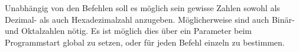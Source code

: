Unabhängig von den Befehlen soll es möglich sein gewisse Zahlen sowohl als Dezimal- als auch Hexadezimalzahl anzugeben. Möglicherweise sind auch Binär- und Oktalzahlen nötig. Es ist möglich dies über ein Parameter beim Programmstart global zu setzen, oder für jeden Befehl einzeln zu bestimmen.